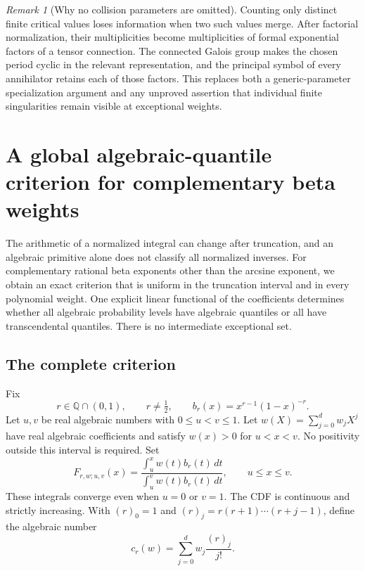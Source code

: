 \documentclass[11pt,a4paper]{article}
\theoremstyle{definition}
\theoremstyle{remark}
\newtheorem{remark}[theorem]{Remark}
\numberwithin{equation}{section}
\begin{document}
\begin{remark}[Why no collision parameters are omitted]
Counting only distinct finite critical values loses information
when two such values merge. After factorial normalization, their
multiplicities become multiplicities of formal exponential factors
of a tensor connection. The connected Galois group makes the chosen
period cyclic in the relevant representation, and the principal
symbol of every annihilator retains each of those factors. This
replaces both a generic-parameter specialization argument and any
unproved assertion that individual finite singularities remain
visible at exceptional weights.
\end{remark}


\clearpage

\section{A global algebraic-quantile criterion for complementary beta weights}
\label{p7:cb:section}

The arithmetic of a normalized integral can change after truncation,
and an algebraic primitive alone does not classify all normalized
inverses. For complementary rational beta exponents other than the
arcsine exponent, we obtain an exact criterion that is uniform in the
truncation interval and in every polynomial weight. One explicit linear
functional of the coefficients determines whether all algebraic
probability levels have algebraic quantiles or all have transcendental
quantiles. There is no intermediate exceptional set.

\subsection{The complete criterion}

Fix
\[
 r\in\mathbb Q\cap(0,1),\qquad r\ne\tfrac12,
 \qquad b_r(x)=x^{r-1}(1-x)^{-r}.
\]
Let $u,v$ be real algebraic numbers with $0\le u<v\le1$.
Let $w(X)=\sum_{j=0}^d w_jX^j$ have real algebraic coefficients
and satisfy $w(x)>0$ for $u<x<v$. No positivity outside this
interval is required. Set
\begin{equation}\label{p7:cb:cdf}
 F_{r,w;u,v}(x)
 =\frac{\displaystyle\int_u^x w(t)b_r(t)\,dt}
        {\displaystyle\int_u^v w(t)b_r(t)\,dt},
 \qquad u\le x\le v.
\end{equation}
These integrals converge even when $u=0$ or $v=1$.
The CDF is continuous and strictly increasing.
With $(r)_0=1$ and $(r)_j=r(r+1)\cdots(r+j-1)$, define
the algebraic number
\begin{equation}\label{p7:cb:criterion}
 c_r(w)=\sum_{j=0}^d w_j\frac{(r)_j}{j!}.
\end{equation}
\end{document}
